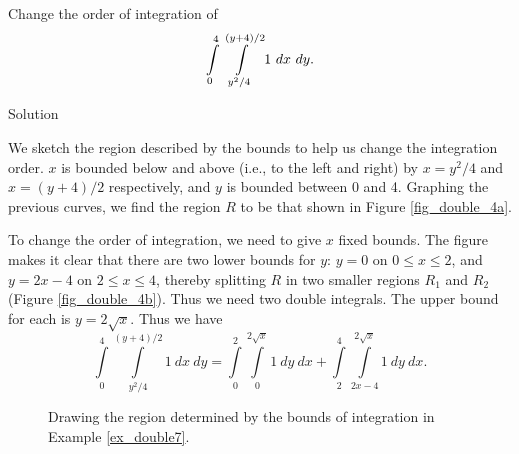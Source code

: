 \begin{example}\label{ex_double7}
Change the order of integration of $$\ds\int\limits_0^4\int\limits_{y^2/4}^{(y+4)/2}1\ dx\ dy.$$

Solution 

We sketch the region described by the bounds to help us change the integration order. $x$ is bounded below and above (i.e., to the left and right) by $x=y^2/4$ and $x=(y+4)/2$ respectively, and $y$ is bounded between 0 and 4. Graphing the previous curves, we find the region $R$ to be that shown in Figure \ref{fig_double_4a}. 


To change the order of integration, we need to give $x$ fixed bounds. The figure makes it clear that there are two lower bounds for $y$: $y=0$ on $0\leq x\leq 2$, and $y=2x-4$ on $2\leq x\leq 4$, thereby splitting $R$ in two smaller regions $R_1$ and $R_2$ (Figure \ref{fig_double_4b}). Thus we need two double integrals. The upper bound for each is $y=2\sqrt{x}$. Thus we have
$$\int\limits_0^4\int\limits_{y^2/4}^{(y+4)/2}1\ dx\ dy = \int\limits_0^2\int\limits_0^{2\sqrt{x}} 1\ dy\ dx + \int\limits_2^4\int\limits_{2x-4}^{2\sqrt{x}}1\ dy\ dx.$$



\begin{figure}[H]
\centering
\qquad
{}
\caption{Drawing the region determined by the bounds of integration in Example \ref{ex_double7}. }
\end{figure}


\end{example}

